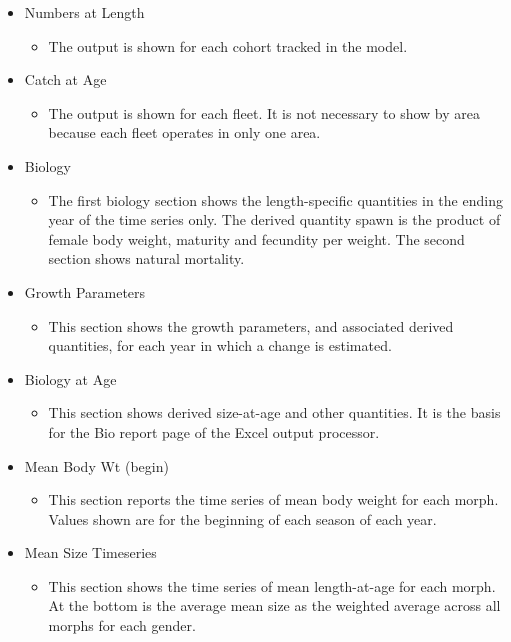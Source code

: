 \begin{itemize}
\begin{itemize}
	\end{itemize}
	\item Numbers at Length
	\begin{itemize}
		\item The output is shown for each cohort tracked in the model.
	\end{itemize}
	\item Catch at Age
	\begin{itemize}
		\item The output is shown for each fleet.  It is not necessary to show by area because each fleet operates in only one area.
	\end{itemize}
	\item Biology
	\begin{itemize}
		\item The first biology section shows the length-specific quantities in the ending year of the time series only.  The derived quantity spawn is the product of female body weight, maturity and fecundity per weight.  The second section shows natural mortality.
	\end{itemize}
	\item Growth Parameters
	\begin{itemize}
		\item This section shows the growth parameters, and associated derived quantities, for each year in which a change is estimated.
	\end{itemize}
	\item Biology at Age
	\begin{itemize}
		\item This section shows derived size-at-age and other quantities.  It is the basis for the Bio report page of the Excel output processor.
	\end{itemize}
	\item Mean Body Wt (begin)
	\begin{itemize}
		\item This section reports the time series of mean body weight for each morph.  Values shown are for the beginning of each season of each year.
	\end{itemize}
	\item Mean Size Timeseries
	\begin{itemize}
		\item This section shows the time series of mean length-at-age for each morph.  At the bottom is the average mean size as the weighted average across all morphs for each gender.
	\end{itemize}

\end{itemize}
